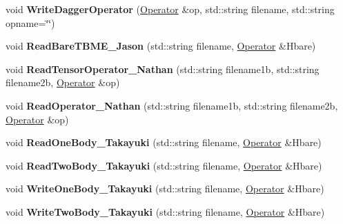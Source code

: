 \begin{DoxyCompactItemize}
\item 
\hypertarget{classReadWrite_a1a19350c1b538df6e4c0a1ec9b446d34}{void {\bfseries Write\-Dagger\-Operator} (\hyperlink{classOperator}{Operator} \&op, std\-::string filename, std\-::string opname=\char`\"{}\char`\"{})}\label{classReadWrite_a1a19350c1b538df6e4c0a1ec9b446d34}

\item 
\hypertarget{classReadWrite_a273740c3bbd9831a59ec8c9e6253340e}{void {\bfseries Read\-Bare\-T\-B\-M\-E\-\_\-\-Jason} (std\-::string filename, \hyperlink{classOperator}{Operator} \&Hbare)}\label{classReadWrite_a273740c3bbd9831a59ec8c9e6253340e}

\item 
\hypertarget{classReadWrite_a0b84a7079b2a9b63377a7f8c25c82cdc}{void {\bfseries Read\-Tensor\-Operator\-\_\-\-Nathan} (std\-::string filename1b, std\-::string filename2b, \hyperlink{classOperator}{Operator} \&op)}\label{classReadWrite_a0b84a7079b2a9b63377a7f8c25c82cdc}

\item 
\hypertarget{classReadWrite_aff6263030fa24814f665607ab36d69ae}{void {\bfseries Read\-Operator\-\_\-\-Nathan} (std\-::string filename1b, std\-::string filename2b, \hyperlink{classOperator}{Operator} \&op)}\label{classReadWrite_aff6263030fa24814f665607ab36d69ae}

\item 
\hypertarget{classReadWrite_a68c95ef4e0dd62149b9d9d77e881c0fc}{void {\bfseries Read\-One\-Body\-\_\-\-Takayuki} (std\-::string filename, \hyperlink{classOperator}{Operator} \&Hbare)}\label{classReadWrite_a68c95ef4e0dd62149b9d9d77e881c0fc}

\item 
\hypertarget{classReadWrite_a1d14f88a129e8ea0f06fa36267055c5c}{void {\bfseries Read\-Two\-Body\-\_\-\-Takayuki} (std\-::string filename, \hyperlink{classOperator}{Operator} \&Hbare)}\label{classReadWrite_a1d14f88a129e8ea0f06fa36267055c5c}

\item 
\hypertarget{classReadWrite_aaf796b90ede280539621f49093b0997b}{void {\bfseries Write\-One\-Body\-\_\-\-Takayuki} (std\-::string filename, \hyperlink{classOperator}{Operator} \&Hbare)}\label{classReadWrite_aaf796b90ede280539621f49093b0997b}

\item 
\hypertarget{classReadWrite_aef29d1ccc288c1471f0f05b1c536934d}{void {\bfseries Write\-Two\-Body\-\_\-\-Takayuki} (std\-::string filename, \hyperlink{classOperator}{Operator} \&Hbare)}\label{classReadWrite_aef29d1ccc288c1471f0f05b1c536934d}


\end{DoxyCompactItemize}
